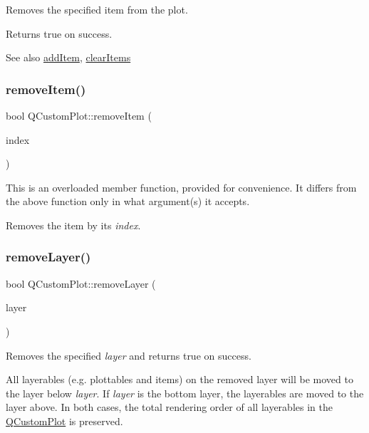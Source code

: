 Removes the specified item from the plot.

Returns true on success.

\begin{DoxySeeAlso}{See also}
\hyperlink{class_q_custom_plot_aa500620379262321685cb7a7674cbd2a}{add\+Item}, \hyperlink{class_q_custom_plot_abdfd07d4f0591d0cf967f85013fd3645}{clear\+Items} 
\end{DoxySeeAlso}
\hypertarget{class_q_custom_plot_abcfdda3d601c0441cab136137d715dea}{}\label{class_q_custom_plot_abcfdda3d601c0441cab136137d715dea} 
\subsubsection{\texorpdfstring{remove\+Item()}{removeItem()}\hspace{0.1cm}{\footnotesize\ttfamily [2/2]}}
{\footnotesize\ttfamily bool Q\+Custom\+Plot\+::remove\+Item (\begin{DoxyParamCaption}\item[{int}]{index }\end{DoxyParamCaption})}

This is an overloaded member function, provided for convenience. It differs from the above function only in what argument(s) it accepts.

Removes the item by its {\itshape index}. \hypertarget{class_q_custom_plot_a40f75e342c5eaab6a86066a42a0e2a94}{}\label{class_q_custom_plot_a40f75e342c5eaab6a86066a42a0e2a94} 
\subsubsection{\texorpdfstring{remove\+Layer()}{removeLayer()}}
{\footnotesize\ttfamily bool Q\+Custom\+Plot\+::remove\+Layer (\begin{DoxyParamCaption}\item[{\hyperlink{class_q_c_p_layer}{Q\+C\+P\+Layer} $\ast$}]{layer }\end{DoxyParamCaption})}

Removes the specified {\itshape layer} and returns true on success.

All layerables (e.\+g. plottables and items) on the removed layer will be moved to the layer below {\itshape layer}. If {\itshape layer} is the bottom layer, the layerables are moved to the layer above. In both cases, the total rendering order of all layerables in the \hyperlink{class_q_custom_plot}{Q\+Custom\+Plot} is preserved.

